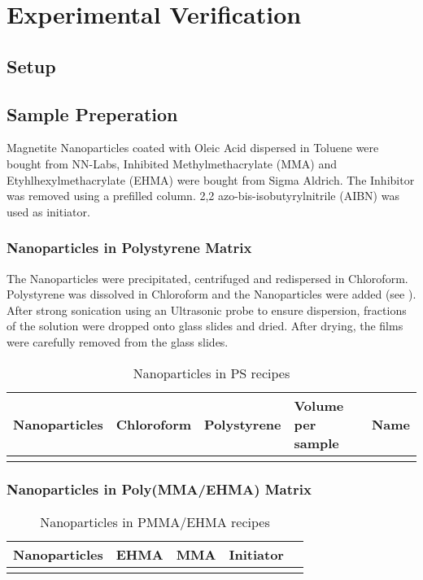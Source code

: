 \chapter{Experimental Verification}
\section{Setup}
\section{Sample Preperation}
Magnetite Nanoparticles coated with Oleic Acid dispersed in Toluene were bought from NN-Labs, Inhibited Methylmethacrylate (MMA) and Etyhlhexylmethacrylate (EHMA)  were bought from Sigma Aldrich. The Inhibitor was removed using a prefilled column. 
2,2 azo-bis-isobutyrylnitrile (AIBN) was used as initiator.
\subsection{Nanoparticles in Polystyrene Matrix}
The Nanoparticles were precipitated, centrifuged and redispersed in Chloroform. Polystyrene was dissolved in Chloroform and the Nanoparticles were added (see ). After strong sonication using an Ultrasonic probe to ensure dispersion, fractions of the solution were dropped onto glass slides and dried. After drying, the films were carefully removed from the glass slides.

\begin{table}
	\centering
	\caption{Nanoparticles in PS recipes}
	\label{tab:samplePS}
	\begin{tabular}{lllll}
		\hline
	Nanoparticles & Chloroform & Polystyrene & Volume per sample & Name \\
		\hline
	  & & & &\\       
		\hline
	\end{tabular}
\end{table}

\subsection{Nanoparticles in Poly(MMA/EHMA)  Matrix}


\begin{table}
	\centering
	\caption{Nanoparticles in PMMA/EHMA recipes}
	\label{tab:samplePS}
	\begin{tabular}{lllll}
		\hline
		Nanoparticles & EHMA & MMA & Initiator \\
		\hline
		& & & &\\       
		\hline
	\end{tabular}
\end{table}


